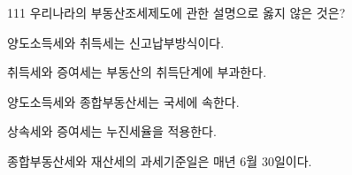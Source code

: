 \begin{question}{111}
우리나라의 부동산조세제도에 관한 설명으로 옳지 않은 것은?
\begin{choices}
  \item 양도소득세와 취득세는 신고납부방식이다.
  \item 취득세와 증여세는 부동산의 취득단계에 부과한다.
  \item 양도소득세와 종합부동산세는 국세에 속한다.
  \item 상속세와 증여세는 누진세율을 적용한다.
  \item 종합부동산세와 재산세의 과세기준일은 매년 6월 30일이다.
\end{choices}
\end{question}
